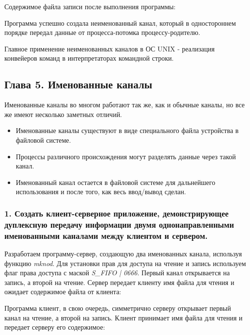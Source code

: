 \documentclass[14pt,a4paper,report]{report}
\begin{document}
Содержимое файла записи после выполнения программы:



Программа успешно создала неименованный канал, который в одностороннем порядке передал данные от процесса-потомка процессу-родителю.

Главное применение неименованных каналов в ОС UNIX - реализация конвейеров команд в интерпретаторах командной строки.

\subsection{Глава 5. Именованные каналы}

Именованные каналы во многом работают так же, как и обычные каналы, но все же имеют несколько заметных отличий.

\begin{itemize}
	\item Именованные каналы существуют в виде специального файла устройства в файловой системе.
	\item Процессы различного происхождения могут разделять данные через такой канал.
	\item Именованный канал остается в файловой системе для дальнейшего использования и после того, как весь ввод/вывод сделан.
\end{itemize}

\subsubsection{1.  Создать клиент-серверное приложение, демонстрирующее дуплексную передачу информации двумя однонаправленными именованными каналами между клиентом и сервером.}

Разработаем программу-сервер, создающую два именованных канала, используя функцию \emph{mknod}. Для установки прав для доступа на чтение и запись используем флаг права доступа с маской \emph{S\_FIFO | 0666}. Первый канал открывается на запись, а второй на чтение. Сервер передает клиенту имя файла для чтения и ожидает содержимое файла от клиента:



Программа клиент, в свою очередь, симметрично серверу открывает первый канал на чтение, а второй на запись. Клиент принимает имя файла для чтения и передает серверу его содержимое:


\end{document}
